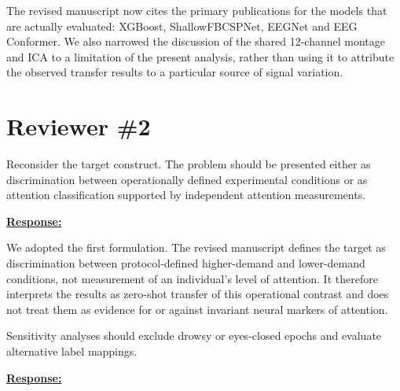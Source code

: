 \documentclass{article}
\begin{document}
The revised manuscript now cites the primary publications for the models that
are actually evaluated: XGBoost, ShallowFBCSPNet, EEGNet and EEG Conformer. We
also narrowed the discussion of the shared 12-channel montage and ICA to a
limitation of the present analysis, rather than using it to attribute the
observed transfer results to a particular source of signal variation.

\vspace{0.3cm}


\newpage
\setcounter{tcb@cnt@cmt}{0}
\section*{Reviewer \#2}

\vspace{0.4cm}

\begin{cmt}{}{}

Reconsider the target construct. The problem should be presented either as
discrimination between operationally defined experimental conditions or as
attention classification supported by independent attention measurements.

\end{cmt}
\vspace{0.1cm}
\noindent
\underline{\textbf{Response:}}
\vspace{0.2cm}

We adopted the first formulation. The revised manuscript defines the target as
discrimination between protocol-defined higher-demand and lower-demand
conditions, not measurement of an individual's level of attention. It therefore
interprets the results as zero-shot transfer of this operational contrast and
does not treat them as evidence for or against invariant neural markers of
attention.

\vspace{0.3cm}


\begin{cmt}{}{}

Sensitivity analyses should exclude drowsy or eyes-closed epochs and evaluate
alternative label mappings.

\end{cmt}
\vspace{0.1cm}
\noindent
\underline{\textbf{Response:}}
\vspace{0.2cm}
\end{document}
